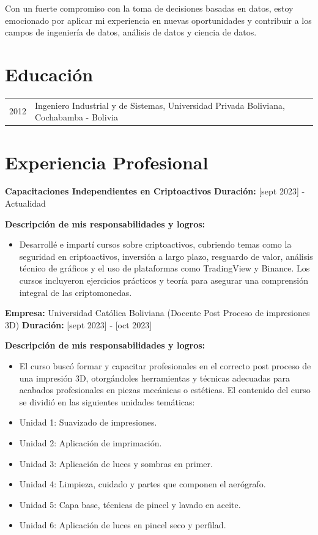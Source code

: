 \documentclass[a4paper,10pt]{article}
\begin{document}
Con un fuerte compromiso con la toma de decisiones basadas en datos, estoy emocionado por aplicar mi experiencia en nuevas oportunidades y contribuir a los campos de ingeniería de datos, análisis de datos y ciencia de datos.

\section*{Educación}
\begin{tabular}{p{3cm}p{12cm}}
    2012 & Ingeniero Industrial y de Sistemas, Universidad Privada Boliviana, Cochabamba - Bolivia \\
\end{tabular}

\section*{Experiencia Profesional}

\textbf{Capacitaciones Independientes en Criptoactivos}  
\textbf{Duración:} [sept 2023] - Actualidad

\textbf{Descripción de mis responsabilidades y logros:}
\begin{itemize}
    \item Desarrollé e impartí cursos sobre criptoactivos, cubriendo temas como la seguridad en criptoactivos, inversión a largo plazo, resguardo de valor, análisis técnico de gráficos y el uso de plataformas como TradingView y Binance. Los cursos incluyeron ejercicios prácticos y teoría para asegurar una comprensión integral de las criptomonedas.
\end{itemize}

\textbf{Empresa:} Universidad Católica Boliviana (Docente Post Proceso de impresiones 3D)  
\textbf{Duración:} [sept 2023] - [oct 2023]

\textbf{Descripción de mis responsabilidades y logros:}
\begin{itemize}
    \item El curso buscó formar y capacitar profesionales en el correcto post proceso de una impresión 3D, otorgándoles herramientas y técnicas adecuadas para acabados profesionales en piezas mecánicas o estéticas. El contenido del curso se dividió en las siguientes unidades temáticas:
    \item Unidad 1: Suavizado de impresiones.
    \item Unidad 2: Aplicación de imprimación.
    \item Unidad 3: Aplicación de luces y sombras en primer.
    \item Unidad 4: Limpieza, cuidado y partes que componen el aerógrafo.
    \item Unidad 5: Capa base, técnicas de pincel y lavado en aceite.
    \item Unidad 6: Aplicación de luces en pincel seco y perfilad.
\end{itemize}
\vspace{15pt} %
\end{document}
